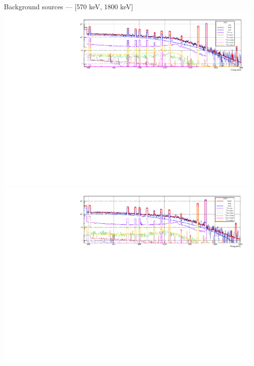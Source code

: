 \documentclass[10pt]{beamer}
\begin{document}
\begin{frame}{Background sources --- [570 keV, 1800 keV]}
	\centering\includegraphics[height=\textwidth, angle=270]{img/bkgBEGe.pdf} \\
	\centering\includegraphics[height=\textwidth, angle=270]{img/bkgCOAX.pdf}
\end{frame}
\end{document}
